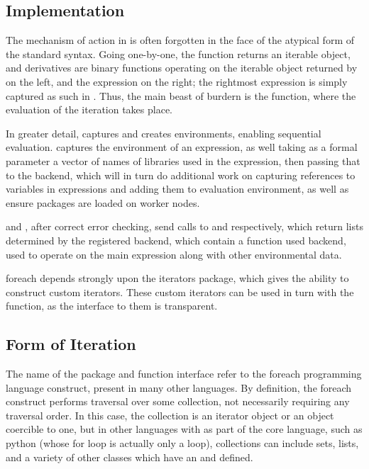 \subsection{Implementation}\label{sec:implementation}

The mechanism of action in  is often forgotten in the face of the
atypical form of the standard syntax. Going one-by-one, the
 function returns an iterable
object,  and derivatives are binary functions operating
on the iterable object returned by
 on the left, and the
expression on the right; the rightmost expression is simply captured as
such in . Thus, the main beast of burdern is the
 function, where the evaluation of the iteration takes
place.

In greater detail,  captures and creates environments,
enabling sequential evaluation.  captures the
environment of an expression, as well taking as a formal parameter a
vector of names of libraries used in the expression, then passing that
to the backend, which will in turn do additional work on capturing
references to variables in expressions and adding them to evaluation
environment, as well as ensure packages are loaded on worker nodes.

 and , after correct error checking,
send calls to  and
 respectively, which return
lists determined by the registered backend, which contain a function
used backend, used to operate on the main expression along with other
environmental data.

foreach depends strongly upon the iterators package, which gives the
ability to construct custom iterators. These custom iterators can be
used in turn with the 
function, as the interface to them is transparent.

\subsection{Form of Iteration}\label{sec:form-iter}

The name of the package and function interface refer to the
foreach programming language construct, present in many other
languages. By definition, the foreach construct performs
traversal over some collection, not necessarily requiring any traversal
order. In this case, the collection is an iterator object or an object
coercible to one, but in other languages with  as part of the
core language, such as python (whose for loop is actually only a 
loop), collections can include sets, lists, and a variety of other
classes which have an  and
 defined\cite{python2020iter}.


